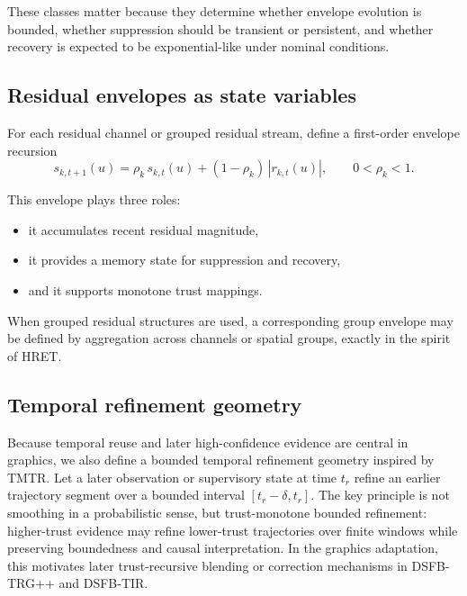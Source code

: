\documentclass[11pt]{article}
\theoremstyle{definition}
\theoremstyle{plain}
\begin{document}
These classes matter because they determine whether envelope evolution is bounded, whether suppression should be transient or persistent, and whether recovery is expected to be exponential-like under nominal conditions. 


\subsection{Residual envelopes as state variables}

For each residual channel or grouped residual stream, define a first-order envelope recursion
\begin{equation}
s_{k,t+1}(u)=\rho_k\,s_{k,t}(u)+(1-\rho_k)\,|r_{k,t}(u)|,
\qquad 0<\rho_k<1.
\end{equation}

This envelope plays three roles:
\begin{itemize}[leftmargin=1.5em]
    \item it accumulates recent residual magnitude,
    \item it provides a memory state for suppression and recovery,
    \item and it supports monotone trust mappings.
\end{itemize}

When grouped residual structures are used, a corresponding group envelope may be defined by aggregation across channels or spatial groups, exactly in the spirit of HRET. 


\subsection{Temporal refinement geometry}

Because temporal reuse and later high-confidence evidence are central in graphics, we also define a bounded temporal refinement geometry inspired by TMTR. Let a later observation or supervisory state at time $t_r$ refine an earlier trajectory segment over a bounded interval $[t_r-\delta,t_r]$. The key principle is not smoothing in a probabilistic sense, but trust-monotone bounded refinement: higher-trust evidence may refine lower-trust trajectories over finite windows while preserving boundedness and causal interpretation. In the graphics adaptation, this motivates later trust-recursive blending or correction mechanisms in DSFB-TRG++ and DSFB-TIR. 
\end{document}
